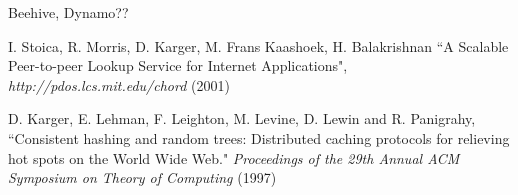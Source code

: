 \documentclass{sig-alternate-10pt}
\begin{document}
Beehive, Dynamo??



%
\vspace{-0.1cm}

\begin{thebibliography}{00}
\vspace{-0.1cm}

I. Stoica, R. Morris, D. Karger, M. Frans Kaashoek, H. Balakrishnan
``A Scalable Peer-to-peer Lookup Service for Internet Applications",
{\em http://pdos.lcs.mit.edu/chord} (2001)

D. Karger, E. Lehman, F. Leighton, M. Levine, D. Lewin and R. Panigrahy,
``Consistent hashing and random trees: Distributed caching protocols for relieving hot spots on the World Wide Web."
{\em Proceedings of the 29th Annual ACM Symposium on Theory of Computing} (1997)

%
%
\end{thebibliography}
\end{document}
